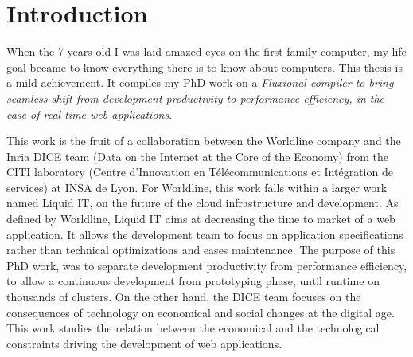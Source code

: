 \eject
\renewcommand{\glyph}{\linecons{\XeTeXglyph36}}%
\chapter{Introduction} \label{chapter:introduction}
\localtableofcontents %
\eject


When the 7 years old I was laid amazed eyes on the first family computer, my life goal became to know everything there is to know about computers.
This thesis is a mild achievement.
It compiles my PhD work on a
\textit{Fluxional compiler to bring seamless shift from development productivity to performance efficiency, in the case of real-time web applications}.


This work is the fruit of a collaboration between the Worldline company and the Inria DICE team (Data on the Internet at the Core of the Economy) from the CITI laboratory (Centre d’Innovation en Télécommunications et Intégration
de services) at INSA de Lyon.
For Worldline, this work falls within a larger work named Liquid IT, on the future of the cloud infrastructure and development.
As defined by Worldline, Liquid IT aims at decreasing the time to market of a web application.
It allows the development team to focus on application specifications rather than technical optimizations and eases maintenance.
The purpose of this PhD work, was to separate development productivity from performance efficiency, to allow a continuous development from prototyping phase, until runtime on thousands of clusters.
On the other hand, the DICE team focuses on the consequences of technology on economical and social changes at the digital age.
This work studies the relation between the economical and the technological constraints driving the development of web applications.

